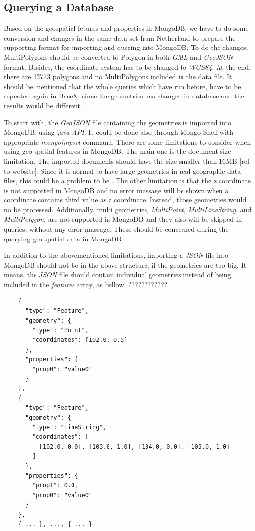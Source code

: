 \documentclass[a4paper,12pt]{article}
\begin{document}
\subsection{Querying a Database}

Based on the geospatial fetures and properties in MongoDB, we have to do some conversion and changes in the same data set from Netherland to prepare the supporting format for importing and quering into MongoDB. To do the changes, MultiPolygons should be converted to Polygon in both \textit{GML} and \textit{GeoJSON} format. Besides, the coordinate system has to be changed to \textit{WGS84}. At the end, there are 12773 polygons and no MultiPolygons included in the data file. It should be mentioned that the whole queries which have run before, have to be repeated again in BaseX, since the geometries has changed in database and the results would be different.

To start with, the \textit{GeoJSON} file containing the geometries is imported into MongoDB, using \textit{java API}. It could be done also through Mongo Shell with appropriate \textit{mongoimport} command. There are some limitations to consider when using geo spatial features in MongoDB. The main one is the document size limitation. The imported documents should have the size smaller than 16MB [ref to website]. Since it is normal to have large geometries in real geographic data files, this could be a problem to be . The other limitation is that the z coordinate is not supported in MongoDB and no error massage will be shown when a coordinate contains third value as z coordinate. Instead, those geometries would no be processed. Additionally, multi geometries, \textit{MultiPoint}, \textit{MultiLineString}, and \textit{MultiPolygon}, are not supported in MongoDB and they also will be skipped in queries, without any error massage. These should be concerned during the querying geo spatial data in MongoDB.

In addition to the abovementioned limitations, importing a \textit{JSON} file into MongoDB should not be in the above structure, if the geometries are too big. It means, the \textit{JSON} file should contain individual geometries instead of being included in the \textit{features} array, as bellow, ????????????
 
\begin{verbatim}
    {
      "type": "Feature",
      "geometry": {
        "type": "Point",
        "coordinates": [102.0, 0.5]
      },
      "properties": {
        "prop0": "value0"
      }
    },
    {
      "type": "Feature",
      "geometry": {
        "type": "LineString",
        "coordinates": [
          [102.0, 0.0], [103.0, 1.0], [104.0, 0.0], [105.0, 1.0]
        ]
      },
      "properties": {
        "prop1": 0.0,
        "prop0": "value0"
      }
    }, 
    { ... }, ..., { ... }
\end{verbatim}
\end{document}
